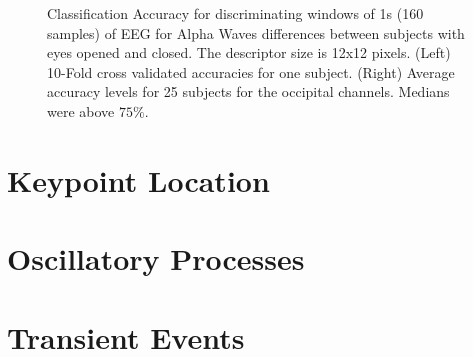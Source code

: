 \begin{figure}[h!]
\centering
{}
\caption[Alpha Waves Classification]{Classification Accuracy for discriminating windows of 1s (160 samples) of EEG for Alpha Waves differences between subjects with eyes opened and closed. The descriptor size is 12x12 pixels. (Left) 10-Fold cross validated accuracies for one subject.  (Right) Average accuracy levels for 25 subjects for the occipital channels. Medians were above $75\%$.}
\label{fig:alpharesults}
\end{figure}

\section{Keypoint Location}

\section{Oscillatory Processes}

\section{Transient Events}

